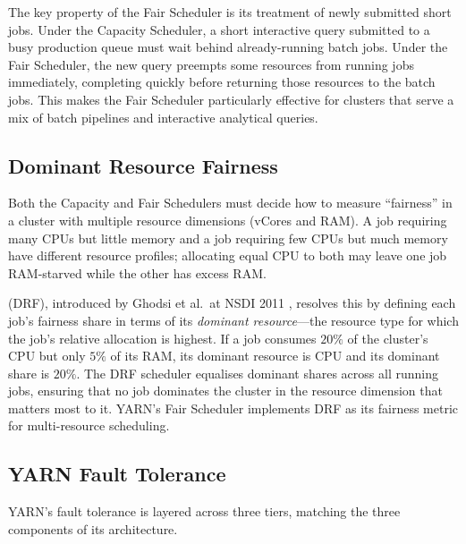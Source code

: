 The key property of the Fair Scheduler is its treatment of newly
submitted short jobs. Under the Capacity Scheduler, a short interactive
query submitted to a busy production queue must wait behind already-running
batch jobs. Under the Fair Scheduler, the new query preempts some
resources from running jobs immediately, completing quickly before
returning those resources to the batch jobs. This makes the Fair Scheduler
particularly effective for clusters that serve a mix of batch pipelines
and interactive analytical queries.

\subsection{Dominant Resource Fairness}
\label{subsec:drf}

Both the Capacity and Fair Schedulers must decide how to measure
``fairness'' in a cluster with multiple resource dimensions (vCores and
RAM). A job requiring many CPUs but little memory and a job requiring
few CPUs but much memory have different resource profiles; allocating
equal CPU to both may leave one job RAM-starved while the other has
excess RAM.

 (DRF), introduced by Ghodsi et al.\
at NSDI 2011 \parencite{DRF2011}, resolves this by defining each job's
fairness share in terms of its \emph{dominant resource}---the resource
type for which the job's relative allocation is highest. If a job consumes
$20\%$ of the cluster's CPU but only $5\%$ of its RAM, its dominant
resource is CPU and its dominant share is $20\%$. The DRF scheduler
equalises dominant shares across all running jobs, ensuring that no job
dominates the cluster in the resource dimension that matters most to it.
YARN's Fair Scheduler implements DRF as its fairness metric for
multi-resource scheduling.

\subsection{YARN Fault Tolerance}
\label{subsec:yarn-fault}

YARN's fault tolerance is layered across three tiers, matching the
three components of its architecture.


